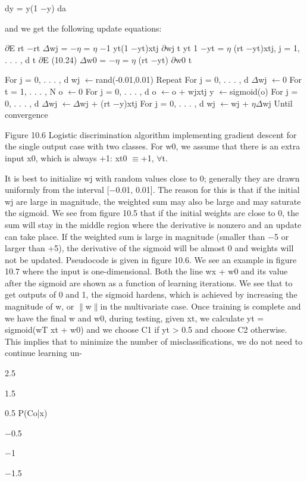 dy = y(1 $-$y) da

and we get the following update equations:

$\partial$E rt $-$rt $\Delta$wj = $-$$\eta$ = $\eta$ $-$1 yt(1 $-$yt)xtj $\partial$wj t yt 1 $-$yt = $\eta$ (rt $-$yt)xtj, j = 1, . . . , d t $\partial$E (10.24) $\Delta$w0 = $-$$\eta$ = $\eta$ (rt $-$yt) $\partial$w0 t

For j = 0, . . . , d wj $\leftarrow$rand(-0.01,0.01) Repeat For j = 0, . . . , d $\Delta$wj $\leftarrow$0 For t = 1, . . . , N o $\leftarrow$0 For j = 0, . . . , d o $\leftarrow$o + wjxtj y $\leftarrow$sigmoid(o) For j = 0, . . . , d $\Delta$wj $\leftarrow$$\Delta$wj + (rt $-$y)xtj For j = 0, . . . , d wj $\leftarrow$wj + $\eta$$\Delta$wj Until convergence

Figure 10.6 Logistic discrimination algorithm implementing gradient descent for the single output case with two classes. For w0, we assume that there is an extra input x0, which is always +1: xt0 $\equiv$+1, $\forall$t.

It is best to initialize wj with random values close to 0; generally they are drawn uniformly from the interval [$-$0.01, 0.01]. The reason for this is that if the initial wj are large in magnitude, the weighted sum may also be large and may saturate the sigmoid. We see from figure 10.5 that if the initial weights are close to 0, the sum will stay in the middle region where the derivative is nonzero and an update can take place. If the weighted sum is large in magnitude (smaller than $-$5 or larger than +5), the derivative of the sigmoid will be almost 0 and weights will not be updated. Pseudocode is given in figure 10.6. We see an example in figure 10.7 where the input is one-dimensional. Both the line wx + w0 and its value after the sigmoid are shown as a function of learning iterations. We see that to get outputs of 0 and 1, the sigmoid hardens, which is achieved by increasing the magnitude of w, or $\parallel$w$\parallel$in the multivariate case. Once training is complete and we have the final w and w0, during testing, given xt, we calculate yt = sigmoid(wT xt + w0) and we choose C1 if yt > 0.5 and choose C2 otherwise. This implies that to minimize the number of misclassifications, we do not need to continue learning un-

2.5

1.5

0.5 P(Co|x)

$-$0.5

$-$1

$-$1.5

